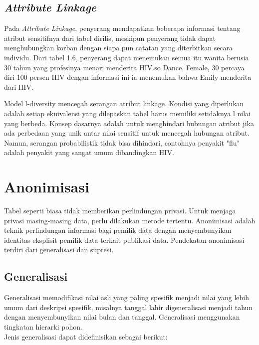 \subsection{\textit{Attribute Linkage}} 
Pada \textit{Attribute Linkage}, penyerang mendapatkan beberapa informasi tentang atribut sensitifnya dari tabel dirilis, meskipun penyerang tidak dapat menghubungkan korban dengan siapa pun catatan yang diterbitkan secara individu. Dari tabel 1.6, penyerang dapat menemukan semua itu wanita berusia 30 tahun yang profesinya menari menderita HIV.so {Dance, Female, 30} percaya diri 100 persen HIV dengan informasi ini ia menemukan bahwa Emily menderita dari HIV. 

\par Model l-diversity mencegah serangan atribut linkage. Kondisi yang diperlukan adalah setiap ekuivalensi yang dilepaskan tabel harus memiliki setidaknya l nilai yang berbeda. Konsep dasarnya adalah untuk menghindari hubungan atribut jika ada perbedaan yang unik antar nilai sensitif untuk mencegah hubungan atribut. Namun, serangan probabilistik tidak bisa dihindari, contohnya penyakit "flu" adalah penyakit yang sangat umum dibandingkan HIV. 

\section{Anonimisasi}
\label{sec:anonimisasi}
Tabel seperti biasa tidak memberikan perlindungan privasi. Untuk menjaga privasi masing-masing data, perlu dilakukan metode tertentu. Anonimisasi adalah teknik  perlindungan informasi bagi pemilik data dengan menyembunyikan identitas eksplisit  pemilik data terkait publikasi data. Pendekatan anonimisasi terdiri dari generalisasi dan supresi.

\subsection{Generalisasi}
Generalisasi memodifikasi nilai asli yang paling spesifik menjadi nilai yang lebih umum dari deskripsi spesifik, misalnya tanggal lahir digeneralisasi menjadi tahun dengan menyembunyikan nilai bulan dan tanggal. Generalisasi menggunakan tingkatan hierarki pohon. \\

\noindent Jenis generalisasi dapat didefinisikan sebagai berikut:

